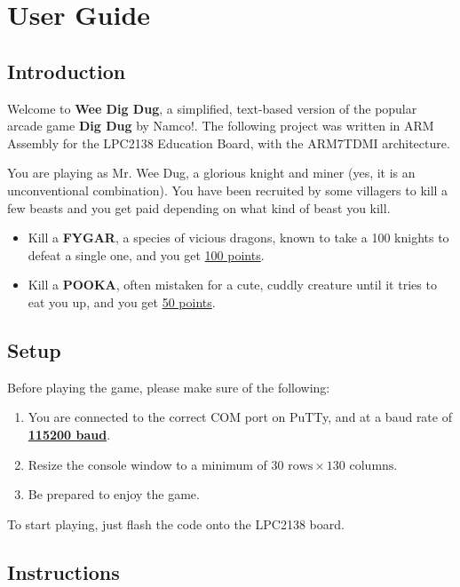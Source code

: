 \section{User Guide}

  \subsection{Introduction}


  \qquad Welcome to \textbf{Wee Dig Dug}, a simplified, text-based version of the popular arcade game \textbf{Dig Dug} by Namco!.
  The following project was written in ARM Assembly for the LPC2138 Education Board, with the ARM7TDMI architecture.

  You are playing as Mr. Wee Dug, a glorious knight and miner (yes, it is an unconventional combination).
  You have been recruited by some villagers to kill a few beasts and you get paid depending on what kind of beast you kill.

  \begin{itemize}
    \item Kill a \textbf{FYGAR}, a species of vicious dragons, known to take a 100 knights to defeat a single one, and you get \underline{100 points}.
    \item Kill a \textbf{POOKA}, often mistaken for a cute, cuddly creature until it tries to eat you up, and you get \underline{50 points}.
  \end{itemize}

  \subsection{Setup}

  Before playing the game, please make sure of the following:

  \begin{enumerate} 
    \item You are connected to the correct COM port on PuTTy, and at a baud rate of \textbf{\underline{115200 baud}}.
    \item Resize the console window to a minimum of $ 30 \text{ rows} \times 130 \text{ columns} $.
    \item Be prepared to enjoy the game.
  \end{enumerate}

  To start playing, just flash the code onto the LPC2138 board.

  \subsection{Instructions}

